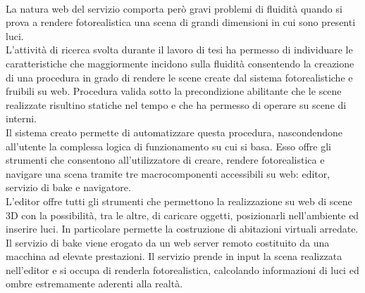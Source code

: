 \\
La natura web del servizio comporta però gravi problemi di fluidità quando si prova a rendere fotorealistica una scena di grandi dimensioni in cui sono presenti luci.
\\
L’attività di ricerca svolta durante il lavoro di tesi ha permesso di individuare le caratteristiche che maggiormente incidono sulla fluidità consentendo la creazione di una procedura in grado di rendere le scene create dal sistema fotorealistiche e fruibili su web.
Procedura valida sotto la precondizione abilitante che le scene realizzate risultino statiche nel tempo e che ha permesso di operare su scene di interni. 
\\
Il sistema creato permette di automatizzare questa procedura, nascondendone all’utente la complessa logica di funzionamento su cui si basa.
Esso offre gli strumenti che consentono all’utilizzatore di creare, rendere fotorealistica e navigare una scena tramite tre macrocomponenti accessibili su web: editor, servizio di bake e navigatore. 
\\
L’editor offre tutti gli strumenti che permettono la realizzazione su web di scene 3D con la possibilità, tra le altre, di caricare oggetti, posizionarli nell’ambiente ed inserire luci. 
In particolare permette la costruzione di abitazioni virtuali arredate.
\\
Il servizio di bake viene erogato da un web server remoto costituito da una macchina ad elevate prestazioni. Il servizio prende in input la scena realizzata nell'editor e si occupa di renderla fotorealistica, calcolando informazioni di luci ed ombre estremamente aderenti alla realtà.
